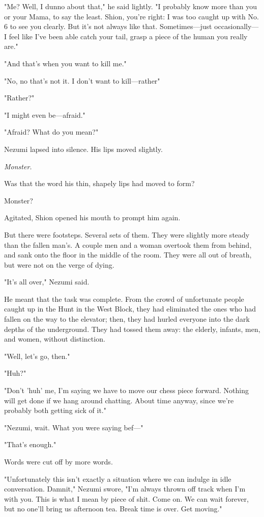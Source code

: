 "Me? Well, I dunno about that," he said lightly. "I probably know more
than you or your Mama, to say the least. Shion, you're right: I was too
caught up with No. 6 to see you clearly. But it's not always like that.
Sometimes---just occasionally---I feel like I've been able catch your tail,
grasp a piece of the human you really are."

"And that's when you want to kill me."

"No, no that's not it. I don't want to kill---rather\el "

"Rather?"

"I might even be---afraid."

"Afraid? What do you mean?"

Nezumi lapsed into silence. His lips moved slightly.

\emph{Monster.}

Was that the word his thin, shapely lips had moved to form?

Monster?

Agitated, Shion opened his mouth to prompt him again.

But there were footsteps. Several sets of them. They were slightly more
steady than the fallen man's. A couple men and a woman overtook them
from behind, and sank onto the floor in the middle of the room. They
were all out of breath, but were not on the verge of dying.

"It's all over," Nezumi said.

He meant that the task was complete. From the crowd of unfortunate
people caught up in the Hunt in the West Block, they had eliminated the
ones who had fallen on the way to the elevator; then, they had hurled
everyone into the dark depths of the underground. They had tossed them
away: the elderly, infants, men, and women, without distinction.

"Well, let's go, then."

"Huh?"~

"Don't 'huh' me, I'm saying we have to move our chess piece forward.
Nothing will get done if we hang around chatting. About time anyway,
since we're probably both getting sick of it."

"Nezumi, wait. What you were saying bef---"

"That's enough."

Words were cut off by more words.

"Unfortunately this isn't exactly a situation where we can indulge in
idle conversation. Damnit," Nezumi swore, "I'm always thrown off track
when I'm with you. This is what I mean by piece of shit. Come on. We can
wait forever, but no one'll bring us afternoon tea. Break time is over.
Get moving."

